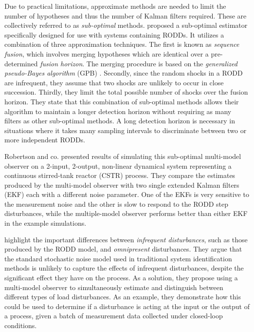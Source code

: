 Due to practical limitations, approximate methods are needed to limit the number of hypotheses and thus the number of Kalman filters required. These are collectively referred to as \textit{sub-optimal} methods. \cite{robertson_detection_1995} proposed a sub-optimal estimator specifically designed for use with systems containing RODDs. It utilizes a combination of three approximation techniques. The first is known as \textit{sequence fusion}, which involves merging hypotheses which are identical over a pre-determined \textit{fusion horizon}. The merging procedure is based on the \textit{generalized pseudo-Bayes algorithm} (GPB) \citep{buxbaum_recursive_1969, jaffer_estimation_1971, tugnait_detection_1982, gustafsson_estimation_1993}. Secondly, since the random shocks in a RODD are infrequent, they assume that two shocks are unlikely to occur in close succession. Thirdly, they limit the total possible number of shocks over the fusion horizon. They state that this combination of sub-optimal methods allows their algorithm to maintain a longer detection horizon without requiring as many filters as other sub-optimal methods. A long detection horizon is necessary in situations where it takes many sampling intervals to discriminate between two or more independent RODDs.

Robertson and co. presented results of simulating this sub-optimal multi-model observer on a 2-input, 2-output, non-linear dynamical system representing a continuous stirred-tank reactor (CSTR) process. They compare the estimates produced by the multi-model observer with two single extended Kalman filters (EKF) each with a different noise parameter. One of the EKFs is very sensitive to the measurement noise and the other is slow to respond to the RODD step disturbances, while the multiple-model observer performs better than either EKF in the example simulations.

\cite{eriksson_classification_1996} highlight the important differences between \textit{infrequent disturbances}, such as those produced by the RODD model, and \textit{omnipresent} disturbances. They argue that the standard stochastic noise model used in traditional system identification methods is unlikely to capture the effects of infrequent disturbances, despite the significant effect they have on the process. As a solution, they propose using a multi-model observer to simultaneously estimate and distinguish between different types of load disturbances. As an example, they demonstrate how this could be used to determine if a disturbance is acting at the input or the output of a process, given a batch of measurement data collected under closed-loop conditions.

